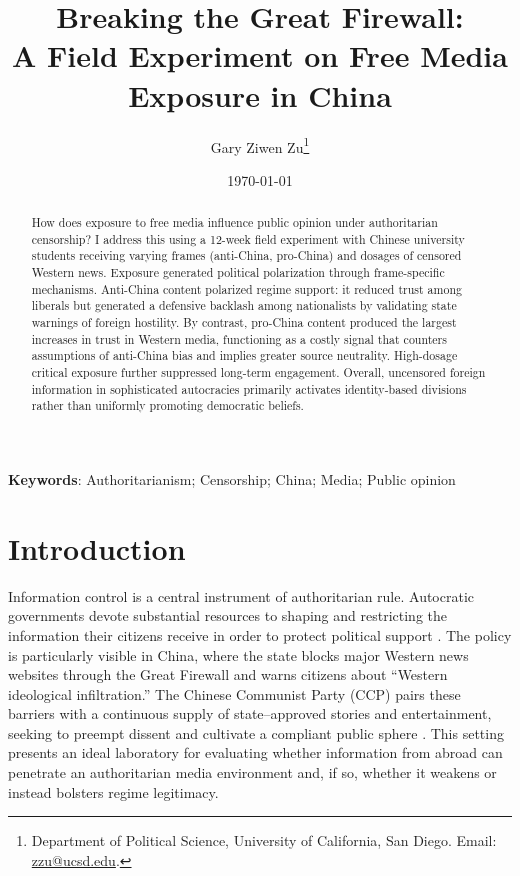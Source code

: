 \documentclass[12pt, american]{article}
\title{\textbf{Breaking the Great Firewall:\\ A Field Experiment on Free Media Exposure in China}}
\author{Gary Ziwen Zu\thanks{Department of Political Science, University of California, San Diego. Email: \href{mailto:zzu@ucsd.edu}{zzu@ucsd.edu}.}}
\date{ \monthyear\today}
\begin{document}
\maketitle
\thispagestyle{empty}


\begin{abstract}
\noindent How does exposure to free media influence public opinion under authoritarian censorship? I address this using a 12-week field experiment with Chinese university students receiving varying frames (anti-China, pro-China) and dosages of censored Western news. Exposure generated political polarization through frame-specific mechanisms. Anti-China content polarized regime support: it reduced trust among liberals but generated a defensive backlash among nationalists by validating state warnings of foreign hostility. By contrast, pro-China content produced the largest increases in trust in Western media, functioning as a costly signal that counters assumptions of anti-China bias and implies greater source neutrality. High-dosage critical exposure further suppressed long-term engagement. Overall, uncensored foreign information in sophisticated autocracies primarily activates identity-based divisions rather than uniformly promoting democratic beliefs.

\end{abstract}


 \textbf{Keywords}: Authoritarianism; Censorship; China; Media; Public opinion   
	
	\newpage
	
	\setcounter{page}{1} 
	\renewcommand{\thepage}{\arabic{page}}
\doublespacing
	\section{Introduction}

Information control is a central instrument of authoritarian rule. Autocratic governments devote substantial resources to shaping and restricting the information their citizens receive in order to protect political support \citep{guriev2019informational, king2013censorship}. The policy is particularly visible in China, where the state blocks major Western news websites through the Great Firewall and warns citizens about “Western ideological infiltration.” The Chinese Communist Party (CCP) pairs these barriers with a continuous supply of state–approved stories and entertainment, seeking to preempt dissent and cultivate a compliant public sphere \citep{stockmann2013media, roberts2018censored}. This setting presents an ideal laboratory for evaluating whether information from abroad can penetrate an authoritarian media environment and, if so, whether it weakens or instead bolsters regime legitimacy.
\end{document}
